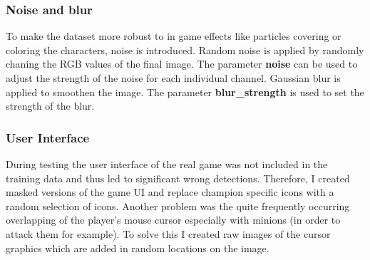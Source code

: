 \subsubsection{Noise and blur}
To make the dataset more robust to in game effects like particles covering or coloring the characters, noise is introduced.
Random noise is applied by randomly chaning the RGB values of the final image.
The parameter \textbf{noise} can be used to adjust the strength of the noise for each individual channel.
Gaussian blur is applied to smoothen the image.
The parameter \textbf{blur\_strength} is used to set the strength of the blur.

\subsubsection{User Interface}
During testing the user interface of the real game was not included in the training data and thus led to significant wrong detections.
Therefore, I created masked versions of the game UI and replace champion specific icons with a random selection of icons.
Another problem was the quite frequently occurring overlapping of the player's mouse cursor especially with minions (in order to attack them for example).
To solve this I created raw images of the cursor graphics which are added in random locations on the image.